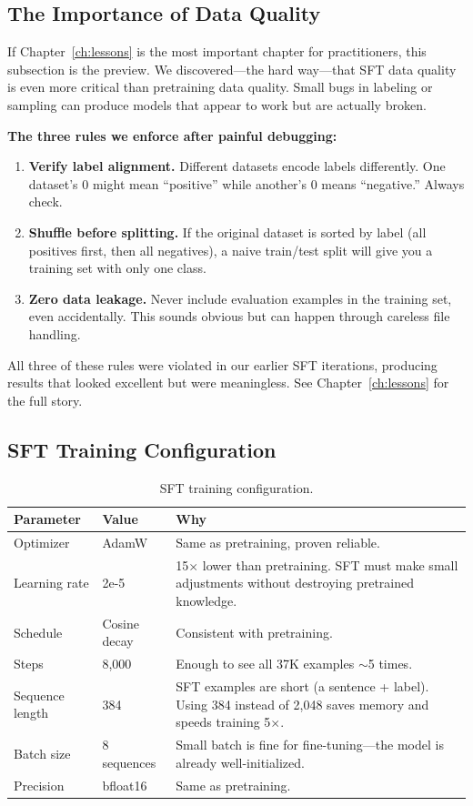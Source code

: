 \documentclass[11pt,a4paper]{article}
\begin{document}
\subsection{The Importance of Data Quality}

If Chapter~\ref{ch:lessons} is the most important chapter for practitioners, this subsection is the preview. We discovered---the hard way---that SFT data quality is even more critical than pretraining data quality. Small bugs in labeling or sampling can produce models that appear to work but are actually broken.

\textbf{The three rules we enforce after painful debugging:}

\begin{enumerate}
    \item \textbf{Verify label alignment.} Different datasets encode labels differently. One dataset's 0 might mean ``positive'' while another's 0 means ``negative.'' Always check.
    \item \textbf{Shuffle before splitting.} If the original dataset is sorted by label (all positives first, then all negatives), a naive train/test split will give you a training set with only one class.
    \item \textbf{Zero data leakage.} Never include evaluation examples in the training set, even accidentally. This sounds obvious but can happen through careless file handling.
\end{enumerate}

All three of these rules were violated in our earlier SFT iterations, producing results that looked excellent but were meaningless. See Chapter~\ref{ch:lessons} for the full story.

\subsection{SFT Training Configuration}

\begin{table}[H]
\centering
\begin{tabular}{llp{6.5cm}}
\toprule
\textbf{Parameter} & \textbf{Value} & \textbf{Why} \\
\midrule
Optimizer & AdamW & Same as pretraining, proven reliable. \\
Learning rate & 2e-5 & 15$\times$ lower than pretraining. SFT must make small adjustments without destroying pretrained knowledge. \\
Schedule & Cosine decay & Consistent with pretraining. \\
Steps & 8,000 & Enough to see all 37K examples $\sim$5 times. \\
Sequence length & 384 & SFT examples are short (a sentence + label). Using 384 instead of 2,048 saves memory and speeds training 5$\times$. \\
Batch size & 8 sequences & Small batch is fine for fine-tuning---the model is already well-initialized. \\
Precision & bfloat16 & Same as pretraining. \\
\bottomrule
\end{tabular}
\caption{SFT training configuration.}
\label{tab:sft_config}
\end{table}
\end{document}
